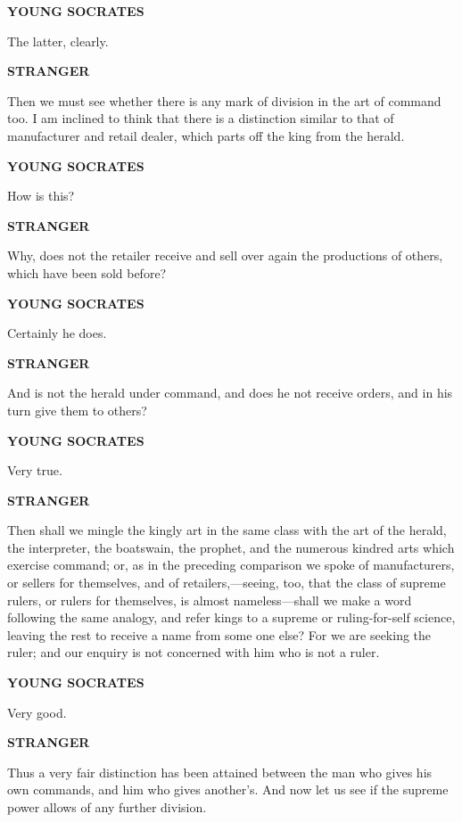 \documentclass[11pt,letter]{article}
\begin{document}
\par \textbf{YOUNG SOCRATES}
\par   The latter, clearly.

\par \textbf{STRANGER}
\par   Then we must see whether there is any mark of division in the art of command too. I am inclined to think that there is a distinction similar to that of manufacturer and retail dealer, which parts off the king from the herald.

\par \textbf{YOUNG SOCRATES}
\par   How is this?

\par \textbf{STRANGER}
\par   Why, does not the retailer receive and sell over again the productions of others, which have been sold before?

\par \textbf{YOUNG SOCRATES}
\par   Certainly he does.

\par \textbf{STRANGER}
\par   And is not the herald under command, and does he not receive orders, and in his turn give them to others?

\par \textbf{YOUNG SOCRATES}
\par   Very true.

\par \textbf{STRANGER}
\par   Then shall we mingle the kingly art in the same class with the art of the herald, the interpreter, the boatswain, the prophet, and the numerous kindred arts which exercise command; or, as in the preceding comparison we spoke of manufacturers, or sellers for themselves, and of retailers,—seeing, too, that the class of supreme rulers, or rulers for themselves, is almost nameless—shall we make a word following the same analogy, and refer kings to a supreme or ruling-for-self science, leaving the rest to receive a name from some one else? For we are seeking the ruler; and our enquiry is not concerned with him who is not a ruler.

\par \textbf{YOUNG SOCRATES}
\par   Very good.

\par \textbf{STRANGER}
\par   Thus a very fair distinction has been attained between the man who gives his own commands, and him who gives another's. And now let us see if the supreme power allows of any further division.
\end{document}
